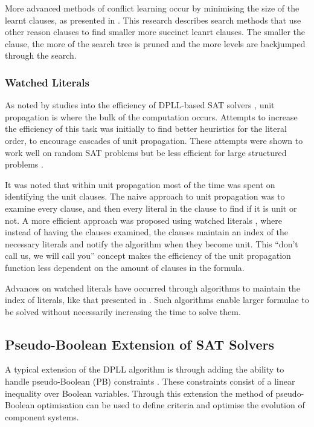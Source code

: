 More advanced methods of conflict learning occur by minimising the size of the learnt clauses, as presented in \cite{sorensson2009}.
This research describes search methods that use other reason clauses to find smaller more succinct leanrt clauses.
The smaller the clause, the more of the search tree is pruned and the more levels are backjumped through the search.

\subsubsection{Watched Literals}
As noted by studies into the efficiency of DPLL-based SAT solvers \citep{dixon2004automating}, unit propagation is where the bulk of the computation occurs.
Attempts to increase the efficiency of this task was initially to find better heuristics \cite{JamesMCrawford1996} for the literal order, to encourage cascades of unit propagation.
These attempts were shown to work well on random SAT problems but be less efficient for large structured problems \citep{dixon2004automating}.

It was noted that within unit propagation most of the time was spent on identifying the unit clauses.
The naive approach to unit propagation was to examine every clause, and then every literal in the clause to find if it is unit or not.
A more efficient approach was proposed using watched literals \citep{Madigan2001}, where instead of having the clauses examined, 
the clauses maintain an index of the necessary literals and notify the algorithm when they become unit.
This ``don't call us, we will call you'' concept makes the efficiency of the unit propagation function less dependent on the amount of clauses in the formula.

Advances on watched literals have occurred through algorithms to maintain the index of literals, like that presented in \cite{Moskewicz2001}.
Such algorithms enable larger formulae to be solved without necessarily increasing the time to solve them.

\subsection{Pseudo-Boolean Extension of SAT Solvers}
A typical extension of the DPLL algorithm is through adding the ability to handle pseudo-Boolean (PB) constraints \citep{dixon2004automating}.
These constraints consist of a linear inequality over Boolean variables.
Through this extension the method of pseudo-Boolean optimisation can be used to define criteria and optimise the evolution of component systems.


